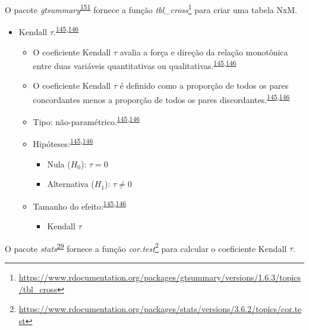 \documentclass[
  a4paper,
]{book}
\providecommand{\tightlist}{%
  \setlength{\itemsep}{0pt}\setlength{\parskip}{0pt}}
\renewcommand{\href}[2]{#2\footnote{\url{#1}}}
\newenvironment{infobox}[1]
  {
  \begin{itemize}
  \renewcommand{\labelitemi}{
    \raisebox{-.7\height}[0pt][0pt]{
      {\setkeys{Gin}{width=3em,keepaspectratio}
        \texttt{[image: \#1]}}
    }
  }
  \setlength{\fboxsep}{1em}
  \begin{blackbox}
  \item
  }
  {
  \end{blackbox}
  \end{itemize}
  }
\begin{document}
\begin{infobox}{images/Rlogo}
O pacote \emph{gtsummary}\textsuperscript{\protect\hyperlink{ref-gtsummary}{151}} fornece a função \href{https://www.rdocumentation.org/packages/gtsummary/versions/1.6.3/topics/tbl_cross}{\emph{tbl\_cross}} para criar uma tabela NxM.

\end{infobox}

\begin{itemize}
\item
  Kendall \(\tau\).\textsuperscript{\protect\hyperlink{ref-khamis2008}{145},\protect\hyperlink{ref-allison2022}{146}}

  \begin{itemize}
  \item
    O coeficiente Kendall \(\tau\) avalia a força e direção da relação monotônica entre duas variáveis quantitativas ou qualitativas.\textsuperscript{\protect\hyperlink{ref-khamis2008}{145},\protect\hyperlink{ref-allison2022}{146}}
  \item
    O coeficiente Kendall \(\tau\) é definido como a proporção de todos os pares concordantes menos a proporção de todos os pares discordantes.\textsuperscript{\protect\hyperlink{ref-khamis2008}{145},\protect\hyperlink{ref-allison2022}{146}}
  \item
    Tipo: não-paramétrico.\textsuperscript{\protect\hyperlink{ref-khamis2008}{145},\protect\hyperlink{ref-allison2022}{146}}
  \item
    Hipóteses:\textsuperscript{\protect\hyperlink{ref-khamis2008}{145},\protect\hyperlink{ref-allison2022}{146}}

    \begin{itemize}
    \item
      Nula (\(H_{0}\)): \(\tau=0\)
    \item
      Alternativa (\(H_{1}\)): \(\tau≠0\)
    \end{itemize}
  \item
    Tamanho do efeito:\textsuperscript{\protect\hyperlink{ref-khamis2008}{145},\protect\hyperlink{ref-allison2022}{146}}

    \begin{itemize}
    \tightlist
    \item
      Kendall \(\tau\)
    \end{itemize}
  \end{itemize}
\end{itemize}

\begin{infobox}{images/Rlogo}
O pacote \emph{stats}\textsuperscript{\protect\hyperlink{ref-stats-2}{29}} fornece a função \href{https://www.rdocumentation.org/packages/stats/versions/3.6.2/topics/cor.test}{\emph{cor.test}} para calcular o coeficiente Kendall \(\tau\).

\end{infobox}
\end{document}
